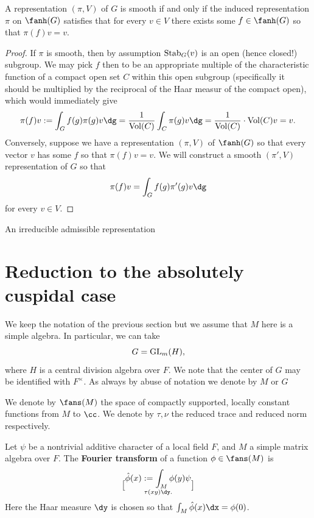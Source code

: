 \documentclass[11pt, x11names, openany]{book}
\begin{document}
\begin{lemma}
  \label{lemma: admissible repns}
A representation $(\pi, V)$ of $G$ is smooth if and only if the induced representation $\pi$ on $\fanh(G)$ satisfies that for every $v \in V$ there exists some $f \in \fanh(G)$ so that $\pi(f)v = v$.
\end{lemma}
\begin{proof}
If $\pi$ is smooth, then by assumption $\operatorname{Stab}_G(v)$ is an open (hence closed!) subgroup. We may pick $f$ then to be an appropriate multiple of the characteristic function of a  compact open set $C$ within this open subgroup (specifically it should be multiplied by the reciprocal of the Haar measur of the compact open), which would immediately give
\begin{equation*}
  \pi(f)v := \int_G f(g) \pi(g) v \dg = \frac{1}{\vol(C)} \int_C \pi(g)v \dg = \frac{1}{\vol(C)} \cdot \vol(C) v = v.
\end{equation*}
Conversely, suppose we have a representation $(\pi, V)$ of $\fanh(G)$ so that every vector $v$ has some $f$ so that $\pi(f)v = v$. We will construct a smooth $(\pi', V)$ representation of $G$ so that
\begin{equation*}
  \pi(f) v = \int_G f(g) \pi'(g) v \dg
\end{equation*}
for every $v \in V$.


\end{proof}


\begin{defn}
\label{def: absolutely cuspidal}
An irreducible admissible representation 
\end{defn}



\section{Reduction to the absolutely cuspidal case}

We keep the notation of the previous section but we assume that $M$ here is a simple algebra. In particular, we can take
\begin{equation*}
  G = \operatorname{GL}_m(H),
\end{equation*}
where $H$ is a central division algebra over $F$. We note that the center of $G$ may be identified with $F^\times$. As always by abuse of notation we denote by $M$ or $G$

We denote by $\fans(M)$ the space of compactly supported, locally constant functions from $M$ to $\cc$. We denote by $\tau, \nu$ the reduced trace and reduced norm respectively. 
\begin{defn}
  \label{def: Fourier transform}
  Let $\psi$ be a nontrivial additive character of a local field $F$, and $M$ a simple matrix algebra over $F$. The \textbf{Fourier transform} of a function $\phi \in \fans(M)$ is
  \begin{equation*}
    \hat{\phi}(x) := \int_M \phi(y) \psi \brack{\tau(xy)} \dy .
  \end{equation*}
  Here the Haar measure $\dy$ is chosen so that $\int_M \hat{\phi}(x) \dx = \phi(0)$.
\end{defn}
\end{document}
